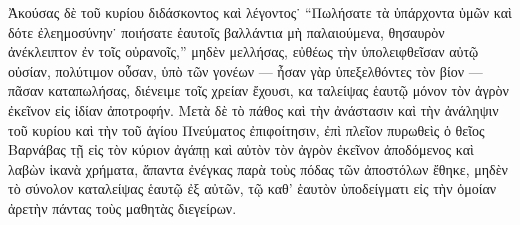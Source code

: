 Ἀκούσας δὲ τοῦ κυρίου διδάσκοντος καὶ λέγοντος˙
\enquote{Πωλήσατε τὰ ὑπάρχοντα ὑμῶν καὶ δότε ἐλεημοσύνην˙
ποιήσατε ἑαυτοῖς βαλλάντια μὴ παλαιούμενα, θησαυρὸν
ἀνέκλειπτον ἐν τοῖς οὐρανοῖς,} μηδὲν μελλήσας, εὐθέως
τὴν ὑπολειφθεῖσαν αὐτῷ οὐσίαν, πολύτιμον οὖσαν, ὑπὸ
τῶν γονέων --- ἦσαν γὰρ ὑπεξελθόντες τὸν βίον --- 
πᾶσαν καταπωλήσας, διένειμε τοῖς χρείαν ἔχουσι, κα%
ταλείψας ἑαυτῷ μόνον τὸν ἀγρὸν ἐκεῖνον εἰς ἰδίαν
ἀποτροφήν. Μετὰ δὲ τὸ πάθος καὶ τὴν ἀνάστασιν καὶ
τὴν ἀνάληψιν τοῦ κυρίου καὶ τὴν τοῦ ἁγίου Πνεύματος
ἐπιφοίτησιν, ἐπὶ πλεῖον πυρωθεὶς ὁ θεῖος Βαρνάβας
τῇ εἰς τὸν κύριον ἀγάπῃ καὶ αὐτὸν τὸν ἀγρὸν ἐκεῖνον
ἀποδόμενος καὶ λαβὼν ἱκανὰ χρήματα, ἅπαντα ἐνέγκας
παρὰ τοὺς πόδας τῶν ἀποστόλων ἔθηκε, μηδὲν τὸ
σύνολον καταλείψας ἑαυτῷ ἐξ αὐτῶν, τῷ καθ’ ἑαυτὸν
ὑποδείγματι εἰς τὴν ὁμοίαν ἀρετὴν πάντας τοὺς μαθητὰς
διεγείρων.

